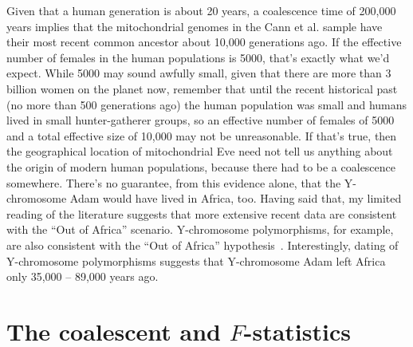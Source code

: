 \documentclass[12pt]{article}
\begin{document}
Given that a human generation is about 20 years, a coalescence time of
200,000 years implies that the mitochondrial genomes in the Cann et
al. sample have their most recent common ancestor about 10,000
generations ago. If the effective number of females in the human
populations is 5000, that's exactly what we'd expect. While 5000 may
sound awfully small, given that there are more than 3 billion women on
the planet now, remember that until the recent historical past (no
more than 500 generations ago) the human population was small and
humans lived in small hunter-gatherer groups, so an effective number
of females of 5000 and a total effective size of 10,000 may not be
unreasonable. If that's true, then the geographical location of
mitochondrial Eve need not tell us anything about the origin of modern
human populations, because there had to be a coalescence
somewhere. There's no guarantee, from this evidence alone, that the
Y-chromosome Adam would have lived in Africa, too. Having said that,
my limited reading of the literature suggests that more extensive
recent data are consistent with the ``Out of Africa''
scenario. Y-chromosome polymorphisms, for example, are also consistent
with the ``Out of Africa''
hypothesis~\cite{Underhill-etal-2000}. Interestingly, dating of
Y-chromosome polymorphisms suggests that Y-chromosome Adam left
Africa only 35,000 -- 89,000 years ago.

\section*{The coalescent and $F$-statistics}
\end{document}
